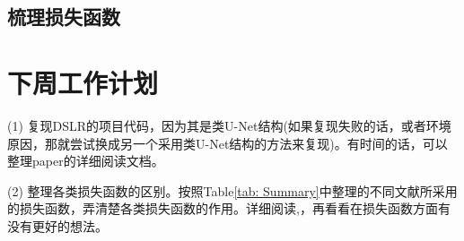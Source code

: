 \documentclass[letterpaper,12pt]{article}
\begin{document}
		\subsection{梳理损失函数}
			

		
	
	\section{下周工作计划}

	(1) 复现DSLR的项目代码，因为其是类U-Net结构(如果复现失败的话，或者环境原因，那就尝试换成另一个采用类U-Net结构的方法来复现)。有时间的话，可以整理paper的详细阅读文档。

	(2) 整理各类损失函数的区别。按照Table\ref{tab: Summary}中整理的不同文献所采用的损失函数，弄清楚各类损失函数的作用。详细阅读\cite{fang2020perceptual},\cite{talebi2018nima}，再看看在损失函数方面有没有更好的想法。
	
	
	
	
\end{document}
